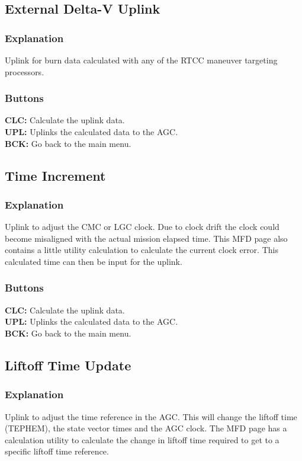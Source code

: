 \documentclass[11pt]{article} %
\begin{document}
\subsection{External Delta-V Uplink}
\subsubsection{Explanation}
Uplink for burn data calculated with any of the RTCC maneuver targeting processors.
\subsubsection{Buttons}
\textbf{CLC:} Calculate the uplink data.\\
\textbf{UPL:} Uplinks the calculated data to the AGC.\\
\textbf{BCK:} Go back to the main menu.\\
\subsection{Time Increment}
\subsubsection{Explanation}
Uplink to adjust the CMC or LGC clock. Due to clock drift the clock could become misaligned with the actual mission elapsed time. This MFD page also contains a little utility calculation to calculate the current clock error. This calculated time can then be input for the uplink.
\subsubsection{Buttons}
\textbf{CLC:} Calculate the uplink data.\\
\textbf{UPL:} Uplinks the calculated data to the AGC.\\
\textbf{BCK:} Go back to the main menu.\\
\subsection{Liftoff Time Update}
\subsubsection{Explanation}
Uplink to adjust the time reference in the AGC. This will change the liftoff time (TEPHEM), the state vector times and the AGC clock. The MFD page has a calculation utility to calculate the change in liftoff time required to get to a specific liftoff time reference.\\
\end{document}
